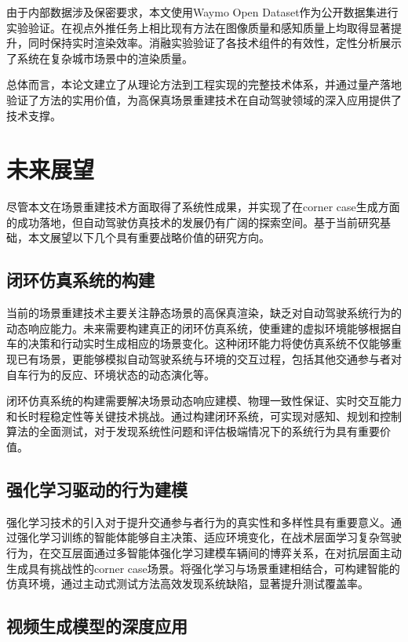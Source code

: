 由于内部数据涉及保密要求，本文使用Waymo Open Dataset作为公开数据集进行实验验证。在视点外推任务上相比现有方法在图像质量和感知质量上均取得显著提升，同时保持实时渲染效率。消融实验验证了各技术组件的有效性，定性分析展示了系统在复杂城市场景中的渲染质量。

总体而言，本论文建立了从理论方法到工程实现的完整技术体系，并通过量产落地验证了方法的实用价值，为高保真场景重建技术在自动驾驶领域的深入应用提供了技术支撑。

\section{未来展望}

尽管本文在场景重建技术方面取得了系统性成果，并实现了在corner case生成方面的成功落地，但自动驾驶仿真技术的发展仍有广阔的探索空间。基于当前研究基础，本文展望以下几个具有重要战略价值的研究方向。

\subsection{闭环仿真系统的构建}

当前的场景重建技术主要关注静态场景的高保真渲染，缺乏对自动驾驶系统行为的动态响应能力。未来需要构建真正的闭环仿真系统，使重建的虚拟环境能够根据自车的决策和行动实时生成相应的场景变化。这种闭环能力将使仿真系统不仅能够重现已有场景，更能够模拟自动驾驶系统与环境的交互过程，包括其他交通参与者对自车行为的反应、环境状态的动态演化等。

闭环仿真系统的构建需要解决场景动态响应建模、物理一致性保证、实时交互能力和长时程稳定性等关键技术挑战。通过构建闭环系统，可实现对感知、规划和控制算法的全面测试，对于发现系统性问题和评估极端情况下的系统行为具有重要价值。

\subsection{强化学习驱动的行为建模}

强化学习技术的引入对于提升交通参与者行为的真实性和多样性具有重要意义。通过强化学习训练的智能体能够自主决策、适应环境变化，在战术层面学习复杂驾驶行为，在交互层面通过多智能体强化学习建模车辆间的博弈关系，在对抗层面主动生成具有挑战性的corner case场景。将强化学习与场景重建相结合，可构建智能的仿真环境，通过主动式测试方法高效发现系统缺陷，显著提升测试覆盖率。

\subsection{视频生成模型的深度应用}

